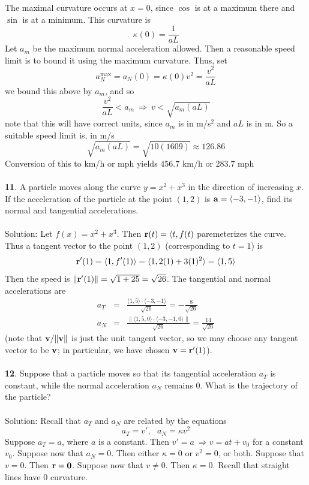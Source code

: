 \documentclass[12pt]{amsbook}
\newcommand{\la}{\langle}
\newcommand{\ra}{\rangle}
\begin{document}
The maximal curvature occurs at $x=0$, since $\cos$ is at a maximum there and $\sin$ is at a minimum. This curvature is
$$\kappa(0)=\frac{1}{aL}$$
Let $a_m$ be the maximum normal acceleration allowed. Then a reasonable speed limit is to bound it using the maximum curvature. Thus, set 
$$a_N^{\text{max}}=a_N(0)=\kappa(0)v^2=\frac{v^2}{aL}$$
we bound this above by $a_m$, and so
$$\frac{v^2}{aL}<a_m \ \Rightarrow \ v<\sqrt{a_m(aL)}$$
note that this will have correct units, since $a_m$ is in m/s$^2$ and $aL$ is in m. So a suitable speed limit is, in m/s
$$\sqrt{a_m(aL)}=\sqrt{10(1609)}\approx 126.86$$
Conversion of this to km/h or mph yields $456.7$ km/h or $283.7$ mph
\\
\\
{\small\bf 11}. A particle moves along the curve $y=x^2+x^3$ in the direction of increasing
$x$. If the acceleration of the particle at the point $(1, 2)$ is ${\bf a} = \la -3,-1 \ra$,
find its normal and tangential accelerations.
\\
\\
{\sc Solution}: Let $f(x)=x^2+x^3$. Then ${\bf r}(t)=\la t,f(t)$ paremeterizes the curve. Thus a tangent vector to the point $(1,2)$ (corresponding to $t=1$) is 
$${\bf r}'(1)=\la 1, f'(1)\ra = \la 1,2(1)+3(1)^2 \ra = \la 1,5 \ra$$
Then the speed is $\|{\bf r}'(1)\|=\sqrt{1+25}=\sqrt{26}$. The tangential and normal accelerations are
\begin{eqnarray*}
a_T&=&\frac{\la 1,5\ra \cdot \la -3,-1 \ra}{\sqrt{26}}=-\frac{8}{\sqrt{26}}\\
a_N&=&\frac{\|\la 1,5,0 \ra \cdot \la -3,-1,0 \ra\|}{\sqrt{26}}=\frac{14}{\sqrt{26}}
\end{eqnarray*}
(note that ${\bf v}/\|{\bf v}\|$ is just the unit tangent vector, so we may choose any tangent vector to be ${\bf v}$; in particular, we have chosen ${\bf v}={\bf r}'(1)$). 
\\
\\
{\small\bf 12}. Suppose that a particle moves so that its tangential acceleration $a_T$ is
constant, while the normal acceleration $a_N$ remains $0$. What is the trajectory
of the particle?
\\
\\
{\sc Solution}: Recall that $a_T$ and $a_N$ are related by the equations
$$a_T=v', \ \ \ a_N=\kappa v^2 $$
Suppose $a_T=a$, where $a$ is a constant. Then $v'=a \ \Rightarrow v=at+v_0$ for a constant $v_0$. Suppose now that $a_N=0$. Then either $\kappa=0$ or $v^2=0$, or both. Suppose that $v=0$. Then ${\bf r}={\bf 0}$. Suppose now that $v\neq 0$. Then $\kappa=0$. Recall that straight lines have $0$ curvature.
\end{document}
